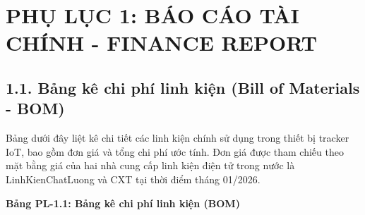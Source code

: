 \documentclass[13pt,a4paper]{extarticle}
\renewcommand{\\}{\thesislongtableorignewline\hline}%
\newcommand{\appendixsection}[1]{\clearpage\section{#1}}
\newcommand{\thesistabletitle}[1]{%
  \begin{center}\textbf{#1}\end{center}%
}
\begin{document}
\appendixsection{PHỤ LỤC 1: BÁO CÁO TÀI CHÍNH - FINANCE
REPORT}\label{phux1ee5-lux1ee5c-1-buxe1o-cuxe1o-tuxe0i-chuxednh---finance-report}

\subsection{1.1. Bảng kê chi phí linh kiện (Bill of Materials -
BOM)}\label{11-bux1ea3ng-kuxea-chi-phuxed-linh-kiux1ec7n-bill-of-materials---bom}

Bảng dưới đây liệt kê chi tiết các linh kiện chính sử dụng trong thiết
bị tracker IoT, bao gồm đơn giá và tổng chi phí ước tính. Đơn giá được
tham chiếu theo mặt bằng giá của hai nhà cung cấp linh kiện điện tử
trong nước là LinhKienChatLuong và CXT tại thời điểm tháng 01/2026.

\thesistabletitle{Bảng PL-1.1: Bảng kê chi phí linh kiện (BOM)}
\end{document}
